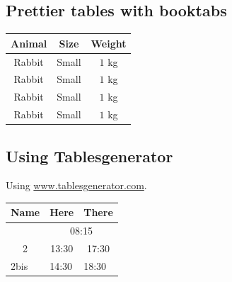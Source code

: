 \documentclass[10pt,a4paper]{article}
\begin{document}
\subsection{Prettier tables with booktabs}


\begin{tabular}{ccc}
    \toprule
    \textbf{Animal} & \textbf{Size} & \textbf{Weight} \\
    \midrule
    Rabbit          & Small         & $1$ kg          \\
    Rabbit          & Small         & $1$ kg          \\
    Rabbit          & Small         & $1$ kg          \\
    Rabbit          & Small         & $1$ kg          \\
    \bottomrule
\end{tabular}

\subsection{Using Tablesgenerator}

Using \url{www.tablesgenerator.com}.

\begin{tabular}{@{}ccc@{}}
    \toprule
    \cellcolor[HTML]{6665CD}Name                    & \cellcolor[HTML]{6665CD}Here                       & There                      \\ \midrule
    \rowcolor[HTML]{6665CD}
    \multicolumn{1}{|c|}{\cellcolor[HTML]{6665CD}1} & \multicolumn{2}{c|}{\cellcolor[HTML]{6665CD}08:15}                              \\ \midrule
    \multicolumn{1}{|c|}{2}                         & \multicolumn{1}{c|}{13:30}                         & \multicolumn{1}{c|}{17:30} \\ \midrule
    \multicolumn{1}{l}{2bis}                        & \multicolumn{1}{l}{14:30}                          & \multicolumn{1}{l}{18:30}  \\ \bottomrule
\end{tabular}
\end{document}
